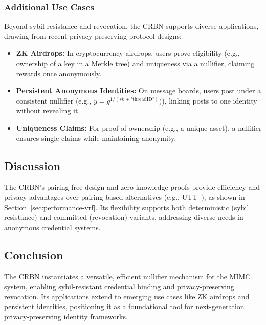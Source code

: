 \subsubsection{Additional Use Cases}\label{subsubsec:other-applications}
Beyond sybil resistance and revocation, the CRBN supports diverse applications, drawing from recent privacy-preserving protocol designs:

\begin{itemize}
    \item \textbf{ZK Airdrops:} In cryptocurrency airdrops, users prove eligibility (e.g., ownership of a key in a Merkle tree) and uniqueness via a nullifier, claiming rewards once anonymously.
    \item \textbf{Persistent Anonymous Identities:} On message boards, users post under a consistent nullifier (e.g., $y = g^{1/(sk + \text{"threadID"})})$), linking posts to one identity without revealing it.
    \item \textbf{Uniqueness Claims:} For proof of ownership (e.g., a unique asset), a nullifier ensures single claims while maintaining anonymity.
\end{itemize}

\subsection{Discussion}
The CRBN’s pairing-free design and zero-knowledge proofs provide efficiency and privacy advantages over pairing-based alternatives (e.g., UTT~\cite{tomescu_utt_2022}), as shown in Section~\ref{sec:performance-vrf}. Its flexibility supports both deterministic (sybil resistance) and committed (revocation) variants, addressing diverse needs in anonymous credential systems.

\subsection{Conclusion}
The CRBN instantiates a versatile, efficient nullifier mechanism for the MIMC system, enabling sybil-resistant credential binding and privacy-preserving revocation. Its applications extend to emerging use cases like ZK airdrops and persistent identities, positioning it as a foundational tool for next-generation privacy-preserving identity frameworks.














